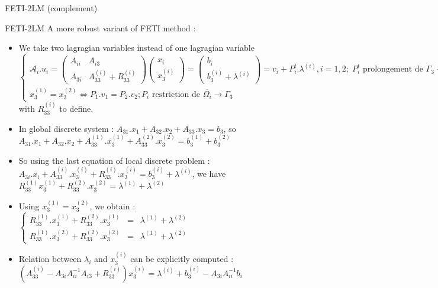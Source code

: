 \documentclass[compress,10pt,aspectratio=169]{beamer}
\begin{document}
\begin{frame}[fragile]{FETI-2LM (complement)}
  \scriptsize
  \begin{block}{FETI-2LM}
  A more robust variant of FETI method :
  \begin{itemize}
    \item We take two lagragian variables instead of one lagragian variable
    $
    \left\{
      \begin{array}{l}
        \mathcal{A}_{i}.u_{i} = 
        \left(\begin{array}{cc}
          A_{ii} & A_{i3} \\
          A_{3i} & A_{33}^{(i)} + R_{33}^{(i)}
        \end{array}\right) \left(
        \begin{array}{c} x_{i} \\ x^{(i)}_{3} 
        \end{array}\right) = \left(
        \begin{array}{c} 
          b_{i} \\ b_{3}^{(i)} + \lambda^{(i)}
        \end{array}\right) = v_{i} + P_{i}^{t}.\lambda^{(i)}, i=1,2;\; P_{i}^{t}\mbox{ prolongement de }\Gamma_{3}\rightarrow \overline{\Omega_{i}}
        \\
        x_{3}^{(1)} = x_{3}^{(2)} \Leftrightarrow P_{1}.v_{1} = P_{2}.v_{2}; P_{i}\mbox{ restriction de }\overline{\Omega_{i}}\rightarrow \Gamma_{3}
      \end{array}
    \right.
    $ with $R_{33}^{(i)}$ to define.
    \item In global discrete system : $A_{31}.x_{1} + A_{32}.x_{2} + A_{33}.x_{3} = b_{3}$, so 
    $A_{31}.x_{1} + A_{32}.x_{2} + A_{33}^{(1)}.x_{3}^{(1)} + A_{33}^{(2)}.x_{3}^{(2)} = b_{3}^{(1)} + b_{3}^{(2)}$
    \item So using the last equation of local discrete problem : 
    $A_{3i}.x_{i} + A_{33}^{(i)}.x_{3}^{(i)} + R_{33}^{(i)}.x_{3}^{(i)} = b_{3}^{(i)} + \lambda^{(i)}$, we have 
    $R_{33}^{(1)}x_{3}^{(1)} + R_{33}^{(2)}.x_{3}^{(2)} = \lambda^{(1)} + \lambda^{(2)}$
    \item Using $x_{3}^{(1)} = x_{3}^{(2)}$, we   obtain :
    $
    \left\{
      \begin{array}{lcl}
        R_{33}^{(1)}.x_{3}^{(1)} + R_{33}^{(2)}.x_{3}^{(1)} & = & \lambda^{(1)} + \lambda^{(2)} \\
        R_{33}^{(1)}.x_{3}^{(2)} + R_{33}^{(2)}.x_{3}^{(2)} & = & \lambda^{(1)} + \lambda^{(2)}
      \end{array}
    \right.
    $
    \item Relation between $\lambda_{i}$ and $x_{3}^{(i)}$ can be explicitly computed :
      $\left(A_{33}^{(i)} - A_{3i}A_{ii}^{-1}A_{i3} + R_{33}^{(i)}\right)x_{3}^{(i)} = \lambda^{(i)} + b_{3}^{(i)} - A_{3i}A_{ii}^{-1}b_{i}$
  \end{itemize}
  \end{block}
\end{frame}
\end{document}
